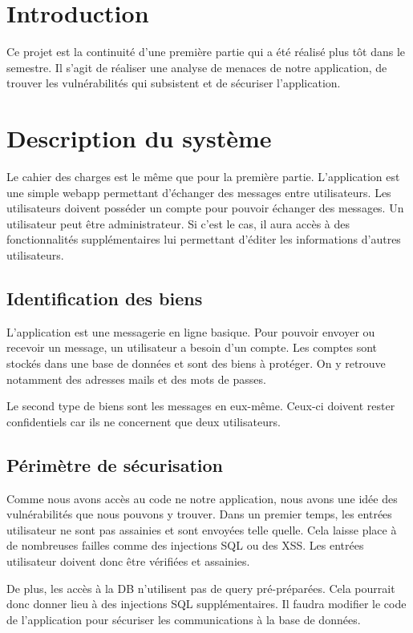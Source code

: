 \documentclass[12pt]{article}
\begin{document}


\tableofcontents

\listoffigures

\newpage
\section{Introduction}
Ce projet est la continuité d'une première partie qui a été réalisé plus tôt dans le semestre. Il s'agit de réaliser une analyse de menaces de notre application, de trouver les vulnérabilités qui subsistent et de sécuriser l'application.

\section{Description du système}
Le cahier des charges est le même que pour la première partie. L'application est une simple webapp permettant d'échanger des messages entre utilisateurs. Les utilisateurs doivent posséder un compte pour pouvoir échanger des messages. Un utilisateur peut être administrateur. Si c'est le cas, il aura accès à des fonctionnalités supplémentaires lui permettant d'éditer les informations d'autres utilisateurs.
\subsection{Identification des biens}
L'application est une messagerie en ligne basique. Pour pouvoir envoyer ou recevoir un message, un utilisateur a besoin d'un compte. Les comptes sont stockés dans une base de données et sont des biens à protéger. On y retrouve notamment des adresses mails et des mots de passes. 

Le second type de biens sont les messages en eux-même. Ceux-ci doivent rester confidentiels car ils ne concernent que deux utilisateurs.

\subsection{Périmètre de sécurisation}
Comme nous avons accès au code ne notre application, nous avons une idée des vulnérabilités que nous pouvons y trouver. Dans un premier temps, les entrées utilisateur ne sont pas assainies et sont envoyées telle quelle. Cela laisse place à de nombreuses failles comme des injections SQL ou des XSS. Les entrées utilisateur doivent donc être vérifiées et assainies.

De plus, les accès à la DB n'utilisent pas de query pré-préparées. Cela pourrait donc donner lieu à des injections SQL supplémentaires. Il faudra modifier le code de l'application pour sécuriser les communications à la base de données.
\end{document}
